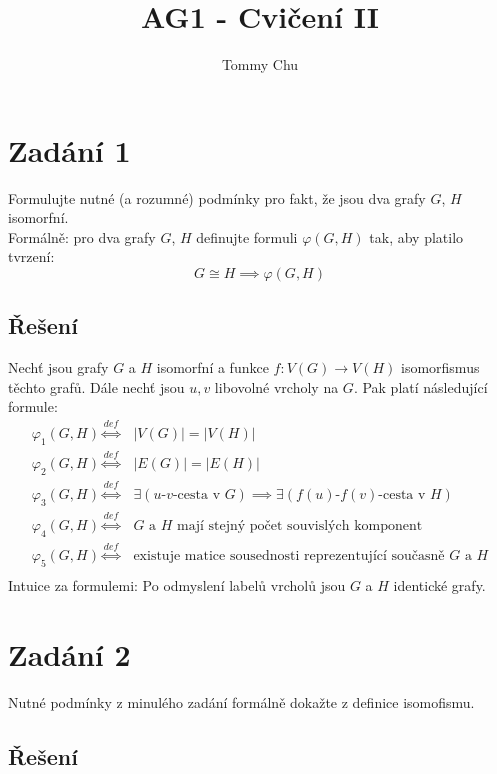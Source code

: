 \documentclass{article}
\title{AG1 - Cvičení II}
\author{Tommy Chu}
\date{}
\begin{document}
\maketitle

\section*{Zadání 1}

Formulujte nutné (a rozumné) podmínky pro fakt, že jsou dva grafy $G$, $H$ isomorfní. \\
Formálně: pro dva grafy $G$, $H$ definujte formuli $\varphi(G, H)$ tak, aby platilo tvrzení: \[ G \cong H \implies \varphi(G, H) \]

\subsection*{Řešení}

Nechť jsou grafy $G$ a $H$ isomorfní a funkce $f \colon V(G) \rightarrow V(H)$ isomorfismus těchto grafů. Dále nechť jsou $u, v$ libovolné vrcholy na $G$. Pak platí následující formule:
\begin{align*}
    \varphi_1(G, H) \overset{def}{\iff} & \lvert V(G) \rvert = \lvert V(H) \rvert                                                  \\
    \varphi_2(G, H) \overset{def}{\iff} & \lvert E(G) \rvert = \lvert E(H) \rvert                                                  \\
    \varphi_3(G, H) \overset{def}{\iff} & \exists (\text{$u$-$v$-cesta v $G$}) \implies \exists (\text{$f(u)$-$f(v)$-cesta v $H$}) \\
    \varphi_4(G, H) \overset{def}{\iff} & \text{$G$ a $H$ mají stejný počet souvislých komponent}                                  \\
    \varphi_5(G, H) \overset{def}{\iff} & \text{existuje matice sousednosti reprezentující současně $G$ a $H$}                     \\
\end{align*}
Intuice za formulemi: Po odmyslení labelů vrcholů jsou $G$ a $H$ identické grafy.

\newpage
\section*{Zadání 2}

Nutné podmínky z minulého zadání formálně dokažte z definice isomofismu.

\subsection*{Řešení}
\end{document}

